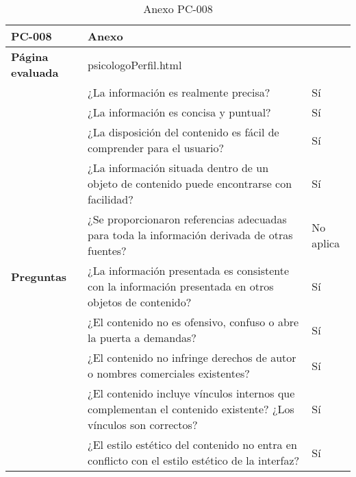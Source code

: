 \begin{table}[htpb]
\centering
\begin{tabularx}{\textwidth}{|l|X|l|}
\hline
\rowcolor[gray]{0.9}\textbf{PC-008}                       & \multicolumn{2}{l|}{Anexo}                                                                                                \\ \hline
\textbf{Página evaluada}             & \multicolumn{2}{l|}{psicologoPerfil.html}                                                                                 \\ \hline
\multirow{10}{*}{\textbf{Preguntas}} & ¿La información es realmente precisa?                                                                         & Sí        \\ \cline{2-3} 
                                     & ¿La información es concisa y puntual?                                                                         & Sí        \\ \cline{2-3} 
                                     & ¿La disposición del contenido es fácil de comprender para el usuario?                                         & Sí        \\ \cline{2-3} 
                                     & ¿La información situada dentro de un objeto de contenido puede encontrarse con facilidad?                     & Sí        \\ \cline{2-3} 
                                     & ¿Se proporcionaron referencias adecuadas para toda la información derivada de otras fuentes?                  & No aplica \\ \cline{2-3} 
                                     & ¿La información presentada es consistente con la información presentada en otros objetos de contenido?        & Sí        \\ \cline{2-3} 
                                     & ¿El contenido no es ofensivo, confuso o abre la puerta a demandas?                                            & Sí        \\ \cline{2-3} 
                                     & ¿El contenido no infringe derechos de autor o nombres comerciales existentes?                                 & Sí        \\ \cline{2-3} 
                                     & ¿El contenido incluye vínculos internos que complementan el contenido existente? ¿Los vínculos son correctos? & Sí        \\ \cline{2-3} 
                                     & ¿El estilo estético del contenido no entra en conflicto con el estilo estético de la interfaz?                & Sí        \\ \hline
\end{tabularx}
\caption{Anexo PC-008}
\end{table}


